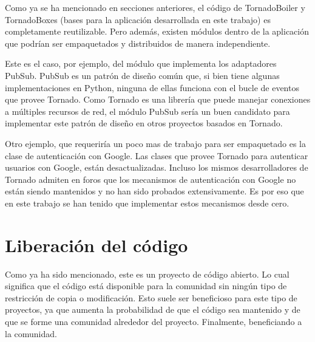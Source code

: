 Como ya se ha mencionado en secciones anteriores, el código de
TornadoBoiler y TornadoBoxes (bases para la aplicación desarrollada en
este trabajo) es completamente reutilizable. Pero además, existen
módulos dentro de la aplicación que podrían ser empaquetados y
distribuidos de manera independiente.

Este es el caso, por ejemplo, del módulo que implementa los adaptadores
PubSub. PubSub es un patrón de diseño común que, si bien tiene algunas
implementaciones en Python, ninguna de ellas funciona con el bucle de
eventos que provee Tornado. Como Tornado es una librería que puede
manejar conexiones a múltiples recursos de red, el módulo PubSub sería
un buen candidato para implementar este patrón de diseño en otros
proyectos basados en Tornado.

Otro ejemplo, que requeriría un poco mas de trabajo para ser empaquetado
es la clase de autenticación con Google. Las clases que provee Tornado
para autenticar usuarios con Google, están desactualizadas. Incluso los
mismos desarrolladores de Tornado admiten en foros que los mecanismos de
autenticación con Google no están siendo mantenidos y no han sido
probados extensivamente. Es por eso que en este trabajo se han tenido
que implementar estos mecanismos desde cero.

\section{Liberación del código}\label{liberaciuxf3n-del-cuxf3digo}

Como ya ha sido mencionado, este es un proyecto de código abierto. Lo
cual significa que el código está disponible para la comunidad sin
ningún tipo de restricción de copia o modificación. Esto suele ser
beneficioso para este tipo de proyectos, ya que aumenta la probabilidad
de que el código sea mantenido y de que se forme una comunidad alrededor
del proyecto. Finalmente, beneficiando a la comunidad.
